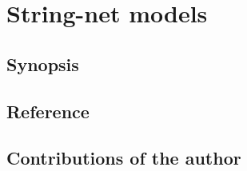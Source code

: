 \newpage

\section{String-net models}

\subsection{Synopsis}

\subsection{Reference}

\subsection{Contributions of the author}
